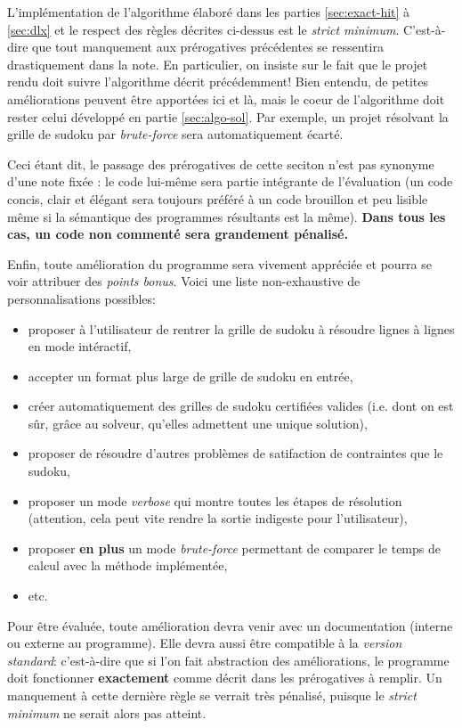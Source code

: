 \documentclass[french,a4paper]{article}
\theoremstyle{definition}
\theoremstyle{remark}
\begin{document}
\medskip

L'implémentation de l'algorithme élaboré dans les parties
\ref{sec:exact-hit} à \ref{sec:dlx} et le respect des règles décrites
ci-dessus est le {\em strict minimum}. C'est-à-dire que tout
manquement aux prérogatives précédentes se ressentira drastiquement
dans la note. En particulier, on insiste sur le fait que le projet
rendu doit suivre l'algorithme décrit précédemment! Bien entendu, de
petites améliorations peuvent être apportées ici et là, mais le coeur
de l'algorithme doit rester celui développé en partie
\ref{sec:algo-sol}. Par exemple, un projet résolvant la grille de
sudoku par {\em brute-force} sera automatiquement écarté.

Ceci étant dit, le passage des prérogatives de cette seciton n'est pas
synonyme d'une note fixée : le code lui-même sera partie intégrante de
l'évaluation (un code concis, clair et élégant sera toujours préféré à
un code brouillon et peu lisible même si la sémantique des programmes
résultants est la même). {\bf Dans tous les cas, un code non commenté
  sera grandement pénalisé.}

\medskip

Enfin, toute amélioration du programme sera vivement appréciée et
pourra se voir attribuer des {\em points bonus}. Voici une liste
non-exhaustive de personnalisations possibles:
\begin{itemize}
\item proposer à l'utilisateur de rentrer la grille de sudoku à
  résoudre lignes à lignes en mode intéractif,
\item accepter un format plus large de grille de sudoku en entrée,
\item créer automatiquement des grilles de sudoku certifiées valides
  (i.e. dont on est sûr, grâce au solveur, qu'elles admettent une
  unique solution),
\item proposer de résoudre d'autres problèmes de satifaction de
  contraintes que le sudoku,
\item proposer un mode {\em verbose} qui montre toutes les étapes de
  résolution (attention, cela peut vite rendre la sortie indigeste
  pour l'utilisateur),
\item proposer {\bf en plus} un mode {\em brute-force} permettant de
  comparer le temps de calcul avec la méthode implémentée,
\item etc.
\end{itemize}
Pour être évaluée, toute amélioration devra venir avec un
documentation (interne ou externe au programme). Elle devra aussi être
compatible à la {\em version standard}: c'est-à-dire que si l'on fait
abstraction des améliorations, le programme doit fonctionner {\bf
  exactement} comme décrit dans les prérogatives à remplir. Un
manquement à cette dernière règle se verrait très pénalisé, puisque le
{\em strict minimum} ne serait alors pas atteint.
\end{document}

